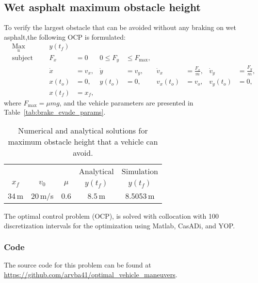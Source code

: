 \subsection{Wet asphalt maximum obstacle height}
To verify the largest obstacle that can be avoided without any braking on wet asphalt,the following OCP is formulated:
\begin{align}
    & \underset{u}{\text{Max}}
    & & & y(t_f)\\
%
    & \text{subject to} 
    & & & F_x &= 0 &0 \leq F_y &\leq F_{\text{max}},\\
%
    &&& & \dot x &= v_x, & \dot y &= v_y, & \dot v_x &= \frac{F_x}{m}, & \dot v_y &= \frac{F_y}{m},\\
%
    &&& & x(t_o) &= 0, & y(t_o) &= 0, & v_x(t_o) &= v_o, & v_y(t_o) &= 0,\\
    &&& & x(t_f) &= x_f,
\end{align}
where $F_{\text{max}} = \mu m g$, and the vehicle parameters are presented in Table~\ref{tab:brake_evade_params}.
\begin{table}[h!]
    \centering
    \begin{tabular}{c|c|c|c|c}
        & & & Analytical & Simulation\\
        $x_f$ & $v_0$ & $\mu$ & $y(t_f)$ & $y(t_f)$ \\
        \hline
        34\,m & 20\,m/s & 0.6 & 8.5\,m & 8.5053\,m \\
    \end{tabular}
    \caption{Numerical and analytical solutions for maximum obstacle height that a vehicle can avoid.}
\end{table}

The optimal control problem (OCP), is solved with collocation with 100 discretization intervals for the optimization using Matlab, CasADi, and YOP. 

\subsubsection{Code}
The source code for this problem can be found at \newline \href{https://github.com/arvba41/optimal_vehicle_maneuvers/blob/main/uppgift/ugf3/brake_or_evade_p2a.m}{https://github.com/arvba41/optimal\_vehicle\_maneuvers}.
